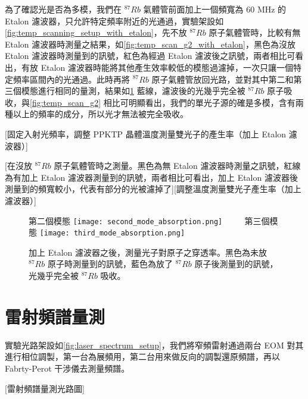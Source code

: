 \documentclass[class=NCU_thesis, crop=false]{standalone}
\begin{document}
為了確認光是否為多模，我們在 $^{87}Rb$ 氣體管前面加上一個頻寬為 60 MHz 的 Etalon 濾波器，只允許特定頻率附近的光通過，實驗架設如 \cref{fig:temp_scanning_setup_with_etalon}，先不放 $^{87}Rb$ 原子氣體管時，比較有無 Etalon 濾波器時測量之結果，如\cref{fig:temp_scan_g2_with_etalon}，黑色為沒放 Etalon 濾波器時測量到的訊號，紅色為經過 Etalon 濾波後之訊號，兩者相比可看出，有放 Etalon 濾波器時能將其他產生效率較低的模態過濾掉，一次只讓一個特定頻率區間內的光通過。此時再將 $^{87}Rb$ 原子氣體管放回光路，並對其中第二和第三個模態進行相同的量測，結果如\cref{fig:absorption_etalon_temp_scanning} 藍線，濾波後的光幾乎完全被 $^{87}Rb$ 原子吸收，與\cref{fig:temp_scan_g2} 相比可明顯看出，我們的單光子源的確是多模，含有兩種以上的頻率的成分，所以光才無法被完全吸收。

[固定入射光頻率，調整 PPKTP 晶體溫度測量雙光子的產生率（加上 Etalon 濾波器）]

[在沒放 $^{87}Rb$ 原子氣體管時之測量。黑色為無 Etalon 濾波器時測量之訊號，紅線為有加上 Etalon 濾波器測量到的訊號，兩者相比可看出，加上 Etalon 濾波器後測量到的頻寬較小，代表有部分的光被濾掉了][調整溫度測量雙光子產生率（加上濾波器）]

\begin{figure}[!hbt]
    \centering
    \subcaptionbox
        {第二個模態
        \label{fig:subfig_fig1}}
        {\texttt{[image: second\_mode\_absorption.png]}}
    ~~~~
    \subcaptionbox
        {第三個模態
        \label{fig:subfig_fig2}}
        {\texttt{[image: third\_mode\_absorption.png]}}
    \caption[加上 Etalon 濾波器之後，光就能完全被原子吸收]{加上 Etalon 濾波器之後，測量光子對原子之穿透率。黑色為未放 $^{87}Rb$ 原子時測量到的訊號，藍色為放了 $^{87}Rb$ 原子後測量到的訊號，光幾乎完全被  $^{87}Rb$ 吸收。}
    \label{fig:absorption_etalon_temp_scanning}
\end{figure}

\section{雷射頻譜量測}

實驗光路架設如\cref{fig:laser_spectrum_setup}，我們將窄頻雷射通過兩台 EOM 對其進行相位調製，第一台為展頻用，第二台用來做反向的調製還原頻譜，再以 Fabrty-Perot 干涉儀去測量頻譜。

[雷射頻譜量測光路圖]
\end{document}
